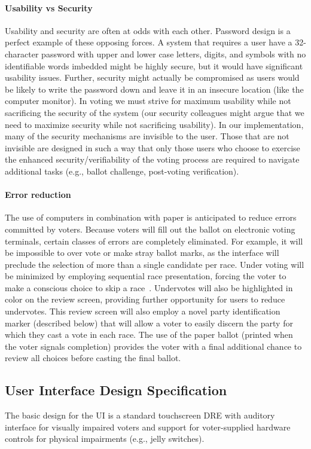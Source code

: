 \paragraph{Usability vs Security}
Usability and security are often at odds with each other. Password design is a perfect example of these opposing forces. A system that requires a user have a
32-character password with upper and lower case letters, digits, and symbols with no identifiable words imbedded might be highly secure, but it would have significant usability issues. Further, security might actually be compromised as users would be likely to write the password down and leave it in an insecure location (like the computer monitor). In voting we must strive for maximum usability while not sacrificing the security of the system (our security colleagues might argue that we need to maximize security while not sacrificing usability). In our implementation, many of the security mechanisms are invisible to the user. Those that are not invisible are designed in such a way that only those users who choose to exercise the enhanced security/verifiability of the voting process are required to navigate additional tasks (e.g., ballot challenge, post-voting verification). 
\paragraph{Error reduction}
The use of computers in combination with paper is anticipated to reduce errors committed by voters. Because voters will fill out the ballot on electronic voting terminals, certain classes of errors are completely eliminated. For example, it will be impossible to over vote or make stray ballot marks, as the interface will preclude the selection of more than a single candidate per race. Under voting will be minimized by employing sequential race presentation, forcing the voter to make a conscious choice to skip a race~\cite{greene-thesis}. Undervotes will also be highlighted in color on the review screen, providing further opportunity for users to reduce undervotes. This review screen will also employ a novel party identification marker (described below) that will allow a voter to easily discern the party for which they cast a vote in each race. The use of the paper ballot (printed when the voter signals completion) provides the voter with a final additional chance to review all choices before casting the final ballot. 

\subsection{User Interface Design Specification}
The basic design for the UI is a standard touchscreen DRE with auditory interface for visually impaired voters and support for voter-supplied hardware controls for physical impairments (e.g., jelly switches).

